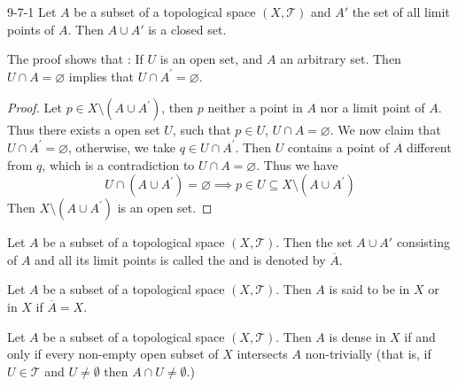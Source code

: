 \documentclass[../main.tex]{subfiles}
\begin{document}
\begin{proposition}{}{9-7-1}
Let $A$ be a subset of a topological space $(X, \mathcal{T})$ and $A'$ the set of all limit points of $A$. Then $A \cup A'$ is a closed set.
\end{proposition}

\begin{remark}
    The proof shows that : If \(  U  \) is an open set, and \(  A  \) an arbitrary set. Then \(  U\cap A= \varnothing  \) implies that \(  U\cap A^{\prime} = \varnothing  \).    
\end{remark}

\begin{proof}
   
    Let \(  p \in X\setminus \left( A\cup A^{\prime}  \right)   \), then \(  p  \) neither a point in \(  A  \) nor a limit point of \(  A  \). Thus there exists a open set  \(  U  \), such that  \(  p \in U  \), \(  U\cap A= \varnothing  \).      We now claim that \(  U\cap A^{\prime} = \varnothing  \), otherwise, we take \(  q \in U\cap A^{\prime}   \). Then \(  U  \) contains a point of \(  A  \) different from \(  q  \), which is a contradiction to \(  U\cap A= \varnothing  \). Thus we have \[
    U\cap \left( A\cup A^{\prime}  \right)= \varnothing\implies p \in U\subseteq  X\setminus \left( A\cup A^{\prime}  \right)  
    \]Then \(  X\setminus \left( A\cup A^{\prime}  \right)   \) is an open set.   
\end{proof}

\begin{definition}{}{}
Let $A$ be a subset of a topological space $(X, \mathcal{T})$. Then the set $A \cup A'$ consisting of $A$ and all its limit points is called the  and is denoted by $\overline{A}$.
\end{definition}

\begin{definition}{}{}
Let $A$ be a subset of a topological space $(X, \mathcal{T})$. Then $A$ is said to be  in $X$ or  in $X$ if $\overline{A} = X$.
\end{definition}
\begin{proposition}{}{}
Let $A$ be a subset of a topological space $(X, \mathcal{T})$. Then $A$ is dense in $X$ if and only if every non-empty open subset of $X$ intersects $A$ non-trivially (that is, if $U \in \mathcal{T}$ and $U \neq \emptyset$ then $A \cap U \neq \emptyset$.)
\end{proposition}
\end{document}
